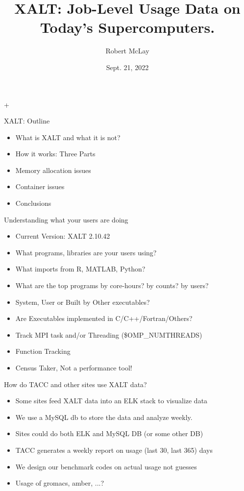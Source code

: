 +\documentclass{beamer}
\begin{document}
\title[XALT]{XALT: Job-Level Usage Data on Today's Supercomputers.}
\author{Robert McLay} 
\date{Sept. 21, 2022}

\frame{\titlepage} 

\begin{frame}{XALT: Outline}
  \begin{itemize}
    \item What is XALT and what it is not?
    \item How it works: Three Parts
    \item Memory allocation issues
    \item Container issues
    \item Conclusions
  \end{itemize}
\end{frame}

\begin{frame}{Understanding what your users are doing}
  \begin{itemize}
    \item Current Version: XALT 2.10.42
    \item What programs, libraries are your users using?
    \item What imports from R, MATLAB, Python?
    \item What are the top programs by core-hours? by counts? by users?
    \item System, User or Built by Other executables?
    \item Are Executables implemented in C/C++/Fortran/Others?
    \item Track MPI task and/or Threading (\$OMP\_NUMTHREADS)
    \item Function Tracking
    \item Census Taker, Not a performance tool!
  \end{itemize}
\end{frame}

\begin{frame}{How do TACC and other sites use XALT data?}
  \begin{itemize}
    \item Some sites feed XALT data into an ELK stack to visualize data
    \item We use a MySQL db to store  the data and analyze weekly.
    \item Sites could do both ELK and MySQL DB (or some other DB)
    \item TACC generates a weekly report on usage (last 30, last 365) days
    \item We design our benchmark codes on actual usage not guesses
    \item Usage of gromacs, amber, ...?
  \end{itemize}
\end{frame}
\end{document}
